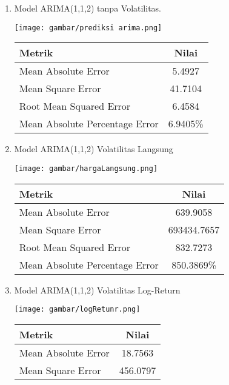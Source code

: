 \documentclass[a4paper,12pt]{article}
\begin{document}
\begin{enumerate}[label=(\alph*)]
    \item Model ARIMA(1,1,2) tanpa Volatilitas.\\
    \begin{table}[H]
        \centering
        \texttt{[image: gambar/prediksi arima.png]}
        \begin{tabular}{l c}
        \toprule
        \textbf{Metrik} & \textbf{Nilai}  \\
        \midrule
        Mean Absolute Error & 5.4927  \\
        Mean Square Error & 41.7104  \\
        Root Mean Squared Error & 6.4584  \\
        Mean Absolute Percentage Error & 6.9405\%  \\
        \bottomrule
        \end{tabular}
    \end{table}
    \vspace{0.3cm}
    \item Model ARIMA(1,1,2) Volatilitas Langsung
    \begin{table}[H]
        \centering
        \texttt{[image: gambar/hargaLangsung.png]}
        \begin{tabular}{l c}
        \toprule
        \textbf{Metrik} & \textbf{Nilai}  \\
        \midrule
        Mean Absolute Error & 639.9058  \\
        Mean Square Error & 693434.7657  \\
        Root Mean Squared Error & 832.7273  \\
        Mean Absolute Percentage Error & 850.3869\%  \\
        \bottomrule
        \end{tabular}
    \end{table}
    \vspace{0.3cm}
    \item Model ARIMA(1,1,2) Volatilitas Log-Return
    \begin{table}[H]
        \centering
        \texttt{[image: gambar/logRetunr.png]}
        \begin{tabular}{l c}
        \toprule
        \textbf{Metrik} & \textbf{Nilai}  \\
        \midrule
        Mean Absolute Error & 18.7563  \\
        Mean Square Error & 456.0797  \\

\end{tabular}
\end{table}
\end{enumerate}
\end{document}
